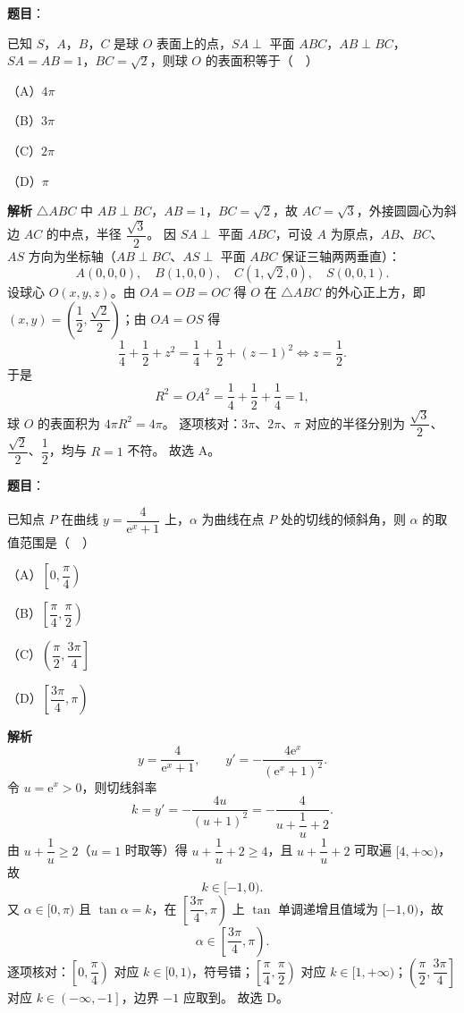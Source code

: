 \begin{answer}

\textbf{题目}：

已知 $S$，$A$，$B$，$C$ 是球 $O$ 表面上的点，$SA\perp$ 平面 $ABC$，$AB\perp BC$，$SA=AB=1$，$BC=\sqrt2$，则球 $O$ 的表面积等于（　）

（A）$4\pi$

（B）$3\pi$

（C）$2\pi$

（D）$\pi$

\textbf{解析}
$\triangle ABC$ 中 $AB\perp BC$，$AB=1$，$BC=\sqrt2$，故 $AC=\sqrt3$，外接圆圆心为斜边 $AC$ 的中点，半径 $\dfrac{\sqrt3}{2}$。
因 $SA\perp$ 平面 $ABC$，可设 $A$ 为原点，$AB$、$BC$、$AS$ 方向为坐标轴（$AB\perp BC$、$AS\perp$ 平面 $ABC$ 保证三轴两两垂直）：
\nopagebreak[4]
\[A(0,0,0),\quad B(1,0,0),\quad C(1,\sqrt2,0),\quad S(0,0,1).\]
设球心 $O(x,y,z)$。由 $OA=OB=OC$ 得 $O$ 在 $\triangle ABC$ 的外心正上方，即 $(x,y)=\left(\dfrac12,\dfrac{\sqrt2}{2}\right)$；由 $OA=OS$ 得
\nopagebreak[4]
\[\frac14+\frac12+z^2=\frac14+\frac12+(z-1)^2\iff z=\frac12.\]
于是
\nopagebreak[4]
\[R^2=OA^2=\frac14+\frac12+\frac14=1,\]
球 $O$ 的表面积为 $4\pi R^2=4\pi$。
逐项核对：$3\pi$、$2\pi$、$\pi$ 对应的半径分别为 $\dfrac{\sqrt3}{2}$、$\dfrac{\sqrt2}{2}$、$\dfrac12$，均与 $R=1$ 不符。
故选 A。


\end{answer}
\begin{answer}

\textbf{题目}：

已知点 $P$ 在曲线 $y=\dfrac{4}{\mathrm e^x+1}$ 上，$\alpha$ 为曲线在点 $P$ 处的切线的倾斜角，则 $\alpha$ 的取值范围是（　）

（A）$\left[0,\dfrac{\pi}{4}\right)$

（B）$\left[\dfrac{\pi}{4},\dfrac{\pi}{2}\right)$

（C）$\left(\dfrac{\pi}{2},\dfrac{3\pi}{4}\right]$

（D）$\left[\dfrac{3\pi}{4},\pi\right)$

\textbf{解析}
\nopagebreak[4]
\[y=\frac{4}{\mathrm e^x+1},\qquad y'=-\frac{4\mathrm e^x}{(\mathrm e^x+1)^2}.\]
令 $u=\mathrm e^x>0$，则切线斜率
\nopagebreak[4]
\[k=y'=-\frac{4u}{(u+1)^2}=-\frac{4}{u+\dfrac1u+2}.\]
由 $u+\dfrac1u\geqslant2$（$u=1$ 时取等）得 $u+\dfrac1u+2\geqslant4$，且 $u+\dfrac1u+2$ 可取遍 $[4,+\infty)$，故
\nopagebreak[4]
\[k\in[-1,0).\]
又 $\alpha\in[0,\pi)$ 且 $\tan\alpha=k$，在 $\left[\dfrac{3\pi}{4},\pi\right)$ 上 $\tan$ 单调递增且值域为 $[-1,0)$，故
\nopagebreak[4]
\[\alpha\in\left[\frac{3\pi}{4},\pi\right).\]
逐项核对：$\left[0,\dfrac\pi4\right)$ 对应 $k\in[0,1)$，符号错；$\left[\dfrac\pi4,\dfrac\pi2\right)$ 对应 $k\in[1,+\infty)$；$\left(\dfrac\pi2,\dfrac{3\pi}{4}\right]$ 对应 $k\in\left(-\infty,-1\right]$，边界 $-1$ 应取到。
故选 D。


\end{answer}
